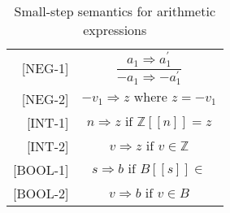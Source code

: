 \begin{table}[H]
\begin{longtable}[c] { r c }
        [NEG-1] & \( \dfrac{a_1 \Rightarrow a^{'}_{1}}{-a_1 \Rightarrow -a^{'}_{1}} \) \\
        
        [NEG-2] & \( -v_1 \Rightarrow z \text{ where } z = -v_1 \)\\
        
        [INT-1] & \( n \Rightarrow z \text{ if } \mathbb{Z}[[n]] = z \) \\
        
        [INT-2] & \( v \Rightarrow z \text{ if } v \in \mathbb{Z} \)\\
        
        [BOOL-1] & \( s \Rightarrow b \text{ if } B[[s]] \in \)\\
        
        [BOOL-2] & \( v \Rightarrow b \text{ if } v \in B \)\\
        
        \hline
    \end{longtable}
    \caption{Small-step semantics for arithmetic expressions}\label{tab:sss_aud}
\end{table}
